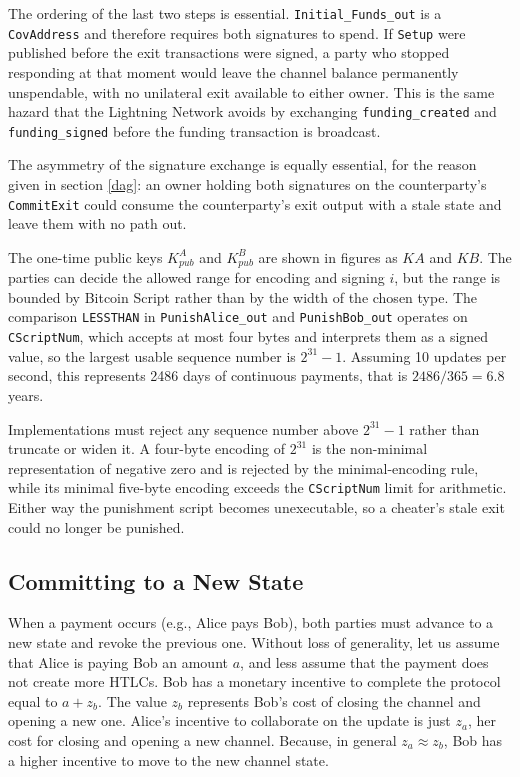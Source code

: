 \documentclass[11pt,a4paper]{article}
\newcommand{\txname}[1]{\texttt{#1}}
\newcommand{\ioname}[1]{\texttt{#1}}
\newcommand{\opc}[1]{\texttt{#1}} %
\begin{document}
The ordering of the last two steps is essential. \ioname{Initial\_Funds\_out} is a \opc{CovAddress} and therefore requires both signatures to spend. If \txname{Setup} were published before the exit transactions were signed, a party who stopped responding at that moment would leave the channel balance permanently unspendable, with no unilateral exit available to either owner. This is the same hazard that the Lightning Network avoids by exchanging \texttt{funding\_created} and \texttt{funding\_signed} before the funding transaction is broadcast.

The asymmetry of the signature exchange is equally essential, for the reason given in section \ref{dag}: an owner holding both signatures on the counterparty's \txname{CommitExit} could consume the counterparty's exit output with a stale state and leave them with no path out.

The one-time public keys $K^A_{pub}$ and $K^B_{pub}$ are shown in figures as $KA$ and $KB$.
The parties can decide the allowed range for encoding and signing $i$, but the range is bounded by Bitcoin Script rather than by the width of the chosen type. The comparison \opc{LESSTHAN} in \ioname{PunishAlice\_out} and \ioname{PunishBob\_out} operates on \texttt{CScriptNum}, which accepts at most four bytes and interprets them as a signed value, so the largest usable sequence number is $2^{31}-1$. Assuming 10 updates per second, this represents 2486 days of continuous payments, that is $2486/365 = 6.8$ years.

Implementations must reject any sequence number above $2^{31}-1$ rather than truncate or widen it. A four-byte encoding of $2^{31}$ is the non-minimal representation of negative zero and is rejected by the minimal-encoding rule, while its minimal five-byte encoding exceeds the \texttt{CScriptNum} limit for arithmetic. Either way the punishment script becomes unexecutable, so a cheater's stale exit could no longer be punished.

\subsection{Committing to a New State}

When a payment occurs (e.g., Alice pays Bob), both parties must advance to a new state and revoke the previous one. Without loss of generality, let us assume that Alice is paying Bob an amount $a$, and less assume that the payment does not create more HTLCs. Bob has a monetary incentive to complete the protocol equal to $a + z_b$. The value $z_b$ represents Bob's cost of closing the channel and opening a new one. Alice's incentive to collaborate on the update is just $z_a$, her cost for closing and opening a new channel. Because, in general $z_a \approx z_b$, Bob has a higher incentive to move to the new channel state.
\end{document}
